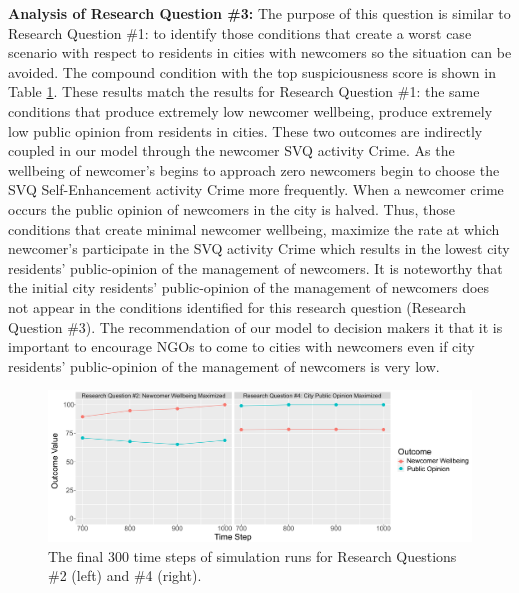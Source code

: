 \documentclass{scspaperproc}
\theoremstyle{scsthe}
\begin{document}
{\bf Analysis of Research Question \#3:} The purpose of this question is similar to Research Question \#1: to identify those conditions that create a worst case scenario with respect to residents in cities with newcomers so the situation can be avoided. The compound condition with the top suspiciousness score is shown in Table \ref{fig:wellbeingvspo}. These results match the results for Research Question \#1: the same conditions that produce extremely low newcomer wellbeing, produce extremely low public opinion from residents in cities. These two outcomes are indirectly coupled in our model through the newcomer SVQ activity Crime. As the wellbeing of newcomer's begins to approach zero newcomers begin to choose the SVQ Self-Enhancement activity Crime more frequently.  When a newcomer crime occurs the public opinion of newcomers in the city is halved. Thus, those conditions that create minimal newcomer wellbeing, maximize the rate at which newcomer's participate in the SVQ activity Crime which results in the lowest city residents' public-opinion of the management of newcomers. It is noteworthy that the initial city residents' public-opinion of the management of newcomers does not appear in the conditions identified for this research question (Research Question \#3). The recommendation of our model to decision makers it that it is important to encourage NGOs to come to cities with newcomers even if city residents' public-opinion of the management of newcomers is very low. 


\label{sec:rq4}

\begin{figure}[htb]
{
\centering
\includegraphics[width=0.67\columnwidth]{WellbeingVsPublicOpinionGraph.png}
\caption{The final 300 time steps of simulation runs for Research Questions \#2 (left) and \#4 (right).}
\label{fig:wellbeingvspo}
}
\end{figure}
\end{document}
